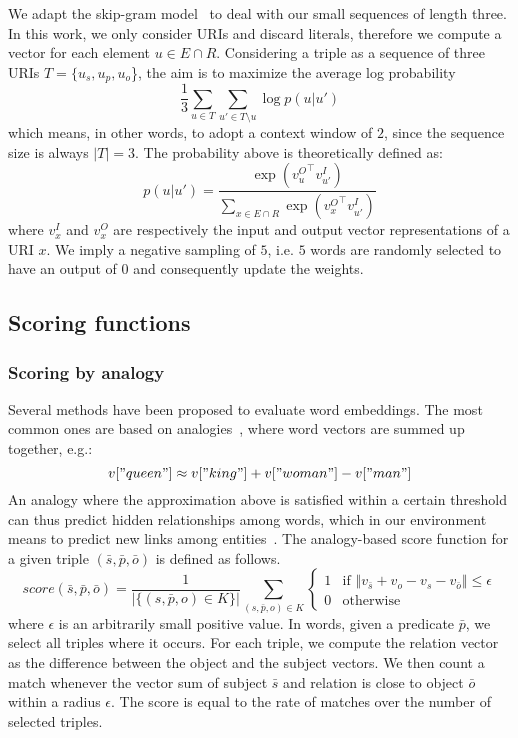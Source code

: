 \documentclass[graybox]{archivesofdatascience}
\begin{document}
We adapt the skip-gram model~\citep{mikolov2013distributed} to deal with our small sequences of length three.
In this work, we only consider URIs and discard literals, therefore we compute a vector for each element $u \in E \cap R$.
Considering a triple as a sequence of three URIs $T = \{u_s, u_p, u_o$\}, the aim is to maximize the average log probability
\begin{equation}
\frac{1}{3} \sum_{u \in T} \sum_{u' \in T \setminus u} \log p(u | u')
\end{equation}
which means, in other words, to adopt a context window of $2$, since the sequence size is always $|T|=3$.
The probability above is theoretically defined as:
\begin{equation}
p(u | u') = \frac{\exp ( {v^O_{u}}^{\top} v^I_{u'} )}{\sum_{x \in E \cap R} \exp ( {v^O_{x}}^{\top} v^I_{u'} )}
\end{equation}
where $v^I_x$ and $v^O_x$ are respectively the input and output vector representations of a URI $x$.
We imply a negative sampling of $5$, i.e. $5$ words are randomly selected to have an output of $0$ and consequently update the weights.

\subsection{Scoring functions}

\subsubsection{Scoring by analogy}

Several methods have been proposed to evaluate word embeddings.
The most common ones are based on analogies~\citep{mikolov2013linguistic,levy2014linguistic}, where word vectors are summed up together, e.g.:
\begin{equation}
v["queen"] \approx v["king"] + v["woman"] - v["man"]
\end{equation}
An analogy where the approximation above is satisfied within a certain threshold can thus predict hidden relationships among words, which in our environment means to predict new links among entities~\cite{ristoski2016rdf2vec}.
The analogy-based score function for a given triple $(\bar{s},\bar{p},\bar{o})$ is defined as follows.
\begin{equation}
score(\bar{s},\bar{p},\bar{o}) = \frac{1}{\left\vert \{ (s,\bar{p},o) \in K \} \right\vert} \sum_{(s,\bar{p},o) \in K} {
\begin{cases}
    1 & \text{if } \left\Vert v_{\bar{s}} + v_o - v_s - v_{\bar{o}} \right\Vert \leq \epsilon \\
    0 & \text{otherwise}
\end{cases}
} 
\end{equation}
where $\epsilon$ is an arbitrarily small positive value.
In words, given a predicate $\bar{p}$, we select all triples where it occurs.
For each triple, we compute the relation vector as the difference between the object and the subject vectors.
We then count a match whenever the vector sum of subject $\bar{s}$ and relation is close to object $\bar{o}$ within a radius $\epsilon$.
The score is equal to the rate of matches over the number of selected triples.
\end{document}
